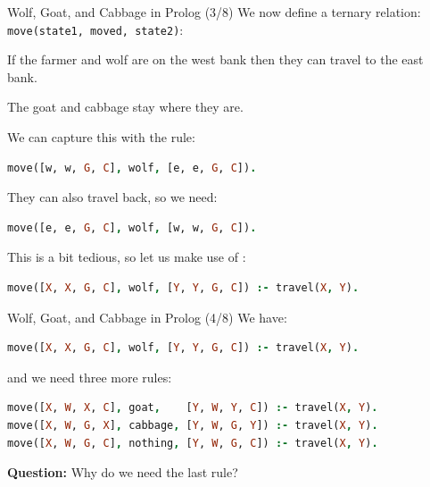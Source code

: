 \begin{frame}[fragile]{Wolf, Goat, and Cabbage in Prolog (3/8)}
We now define a ternary relation: \texttt{move(state1, moved, state2)}:

If the farmer and wolf are on the west bank then they can travel to the east bank. 

The goat and cabbage stay where they are. 

We can capture this with the rule:

\begin{lstlisting}[language=prolog, xleftmargin=0.5cm]
move([w, w, G, C], wolf, [e, e, G, C]).
\end{lstlisting}

\pause

They can also travel back, so we need:

\begin{lstlisting}[language=prolog, xleftmargin=0.5cm]
move([e, e, G, C], wolf, [w, w, G, C]).
\end{lstlisting}

\pause

This is a bit tedious, so let us make use of :

\begin{lstlisting}[language=prolog, xleftmargin=0.5cm]
move([X, X, G, C], wolf, [Y, Y, G, C]) :- travel(X, Y).
\end{lstlisting}
\end{frame}

\begin{frame}[fragile]{Wolf, Goat, and Cabbage in Prolog (4/8)}
We have:

\begin{lstlisting}[language=prolog, xleftmargin=0.5cm]
move([X, X, G, C], wolf, [Y, Y, G, C]) :- travel(X, Y).
\end{lstlisting}

and we need three more rules:

\begin{lstlisting}[language=prolog, xleftmargin=0.5cm]
move([X, W, X, C], goat,    [Y, W, Y, C]) :- travel(X, Y).
move([X, W, G, X], cabbage, [Y, W, G, Y]) :- travel(X, Y).
move([X, W, G, C], nothing, [Y, W, G, C]) :- travel(X, Y).    
\end{lstlisting}

\pause

\textbf{Question:} Why do we need the last rule?
\end{frame}


